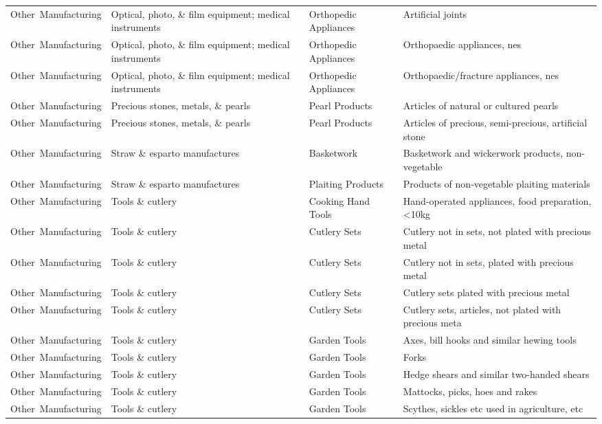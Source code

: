 \begin{appendices}
\begin{xltabular}{\textwidth}{|p{0.11\textwidth}|p{0.29\textwidth}|p{0.20\textwidth}|p{0.30\textwidth}|}
			Other\ Manufacturing & Optical, photo, \& film equipment; medical instruments & Orthopedic Appliances & Artificial joints \\
			Other\ Manufacturing & Optical, photo, \& film equipment; medical instruments & Orthopedic Appliances & Orthopaedic appliances, nes \\
			Other\ Manufacturing & Optical, photo, \& film equipment; medical instruments & Orthopedic Appliances & Orthopaedic/fracture appliances, nes \\
			Other\ Manufacturing & Precious stones, metals, \& pearls & Pearl Products & Articles of natural or cultured pearls \\
			Other\ Manufacturing & Precious stones, metals, \& pearls & Pearl Products & Articles of precious, semi-precious, artificial stone \\
			Other\ Manufacturing & Straw \& esparto manufactures & Basketwork & Basketwork and wickerwork products, non-vegetable \\
			Other\ Manufacturing & Straw \& esparto manufactures & Plaiting Products & Products of non-vegetable plaiting materials \\
			Other\ Manufacturing & Tools \& cutlery & Cooking Hand Tools & Hand-operated appliances, food preparation, <10kg \\
			Other\ Manufacturing & Tools \& cutlery & Cutlery Sets & Cutlery not in sets, not plated with precious metal \\
			Other\ Manufacturing & Tools \& cutlery & Cutlery Sets & Cutlery not in sets, plated with precious metal \\
			Other\ Manufacturing & Tools \& cutlery & Cutlery Sets & Cutlery sets plated with precious metal \\
			Other\ Manufacturing & Tools \& cutlery & Cutlery Sets & Cutlery sets, articles, not plated with precious meta \\
			Other\ Manufacturing & Tools \& cutlery & Garden Tools & Axes, bill hooks and similar hewing tools \\
			Other\ Manufacturing & Tools \& cutlery & Garden Tools & Forks \\
			Other\ Manufacturing & Tools \& cutlery & Garden Tools & Hedge shears and similar two-handed shears \\
			Other\ Manufacturing & Tools \& cutlery & Garden Tools & Mattocks, picks, hoes and rakes \\
			Other\ Manufacturing & Tools \& cutlery & Garden Tools & Scythes, sickles etc used in agriculture, etc \\

\end{xltabular}
\end{appendices}
